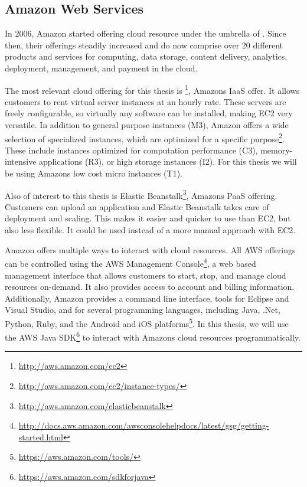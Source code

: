 \subsection{Amazon Web Services}

In 2006, Amazon started offering cloud resource under the umbrella of .
Since then, their offerings steadily increased and do now comprise over 20 different products and services for computing, data storage, content delivery, analytics, deployment, management, and payment in the cloud.

The most relevant cloud offering for this thesis is \footnote{\url{http://aws.amazon.com/ec2}}, Amazons IaaS offer.
It allows customers to rent virtual server instances at an hourly rate.
These servers are freely configurable, so virtually any software can be installed, making EC2 very versatile.
In addition to general purpose instances (M3), Amazon offers a wide selection of specialized instances, which are optimized for a specific purpose\footnote{\url{http://aws.amazon.com/ec2/instance-types/}}.
These include instances optimized for computation performance (C3), memory-intensive applications (R3), or high storage instances (I2).
For this thesis we will be using Amazons low cost micro instances (T1).

Also of interest to this thesis is Elastic Beanstalk\footnote{\url{http://aws.amazon.com/elasticbeanstalk}}, Amazons PaaS offering.
Customers can upload an application and Elastic Beanstalk takes care of deployment and scaling.
This makes it easier and quicker to use than EC2, but also less flexible.
It could be used instead of a more manual approach with EC2.

Amazon offers multiple ways to interact with cloud resources.
All AWS offerings can be controlled using the AWS Management Console\footnote{\url{http://docs.aws.amazon.com/awsconsolehelpdocs/latest/gsg/getting-started.html}}, a web based management interface that allows customers to start, stop, and manage cloud resources on-demand.
It also provides access to account and billing information.
Additionally, Amazon provides a command line interface, tools for Eclipse and Visual Studio, and  for several programming languages, including Java, .Net, Python, Ruby, and the Android and iOS platforms\footnote{\url{https://aws.amazon.com/tools/}}.
In this thesis, we will use the AWS Java SDK\footnote{\url{https://aws.amazon.com/sdkforjava}} to interact with Amazons cloud resources programmatically.
